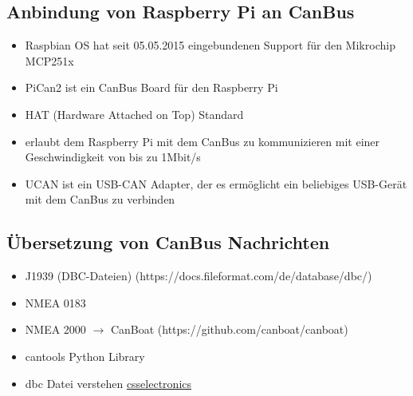 \subsection{Anbindung von Raspberry Pi an CanBus}
\begin{itemize}
    \item Raspbian OS hat seit 05.05.2015 eingebundenen Support für den Mikrochip MCP251x
\end{itemize}
\cite{Salunkhe2016}
\begin{itemize}
    \item PiCan2 ist ein CanBus Board für den Raspberry Pi
    \item HAT (Hardware Attached on Top) Standard
    \item erlaubt dem Raspberry Pi mit dem CanBus zu kommunizieren mit einer Geschwindigkeit von bis zu 1Mbit/s
    \item UCAN ist ein USB-CAN Adapter, der es ermöglicht ein beliebiges USB-Gerät mit dem CanBus zu verbinden
\end{itemize}
\cite{Pant2019}
\subsection{Übersetzung von CanBus Nachrichten}
\begin{itemize}
    \item J1939 (DBC-Dateien) (https://docs.fileformat.com/de/database/dbc/)
    \item NMEA 0183 
    \item NMEA 2000 $\rightarrow$ CanBoat (https://github.com/canboat/canboat)
    \item cantools Python Library 
    \item dbc Datei verstehen \href{https://www.csselectronics.com/pages/can-dbc-file-database-intro}{csselectronics}
\end{itemize}